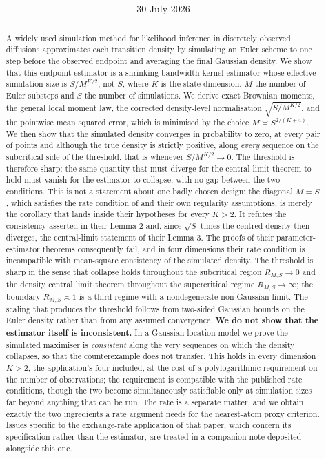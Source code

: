 \documentclass[11pt]{article}
\title{\textbf{\papertitle}}
\author{\authorname\\[0.2em]\small\affiliation\\[0.1em]\small\email\quad\textperiodcentered\quad\orcid\draftlabel}
\date{30 July 2026}
\theoremstyle{definition}
\begin{document}
\maketitle

\begin{abstract}
A widely used simulation method for likelihood inference in discretely observed diffusions approximates each transition density by simulating an Euler scheme to one step before the observed endpoint and averaging the final Gaussian density. We show that this endpoint estimator is a shrinking-bandwidth kernel estimator whose effective simulation size is $S/M^{K/2}$, not $S$, where $K$ is the state dimension, $M$ the number of Euler substeps and $S$ the number of simulations. We derive exact Brownian moments, the general local moment law, the corrected density-level normalisation $\sqrt{S/M^{K/2}}$, and the pointwise mean squared error, which is minimised by the choice $M\asymp S^{2/(K+4)}$. We then show that the simulated density converges in probability to zero, at every pair of points and although the true density is strictly positive, along \emph{every} sequence on the subcritical side of the threshold, that is whenever $S/M^{K/2}\to0$. The threshold is therefore sharp: the same quantity that must diverge for the central limit theorem to hold must vanish for the estimator to collapse, with no gap between the two conditions. This is not a statement about one badly chosen design: the diagonal $M=S$, which satisfies the rate condition of \citet{BrandtSantaClara2002} and their own regularity assumptions, is merely the corollary that lands inside their hypotheses for every $K>2$. It refutes the consistency asserted in their Lemma 2 and, since $\sqrt S$ times the centred density then diverges, the central-limit statement of their Lemma 3. The proofs of their parameter-estimator theorems consequently fail, and in four dimensions their rate condition is incompatible with mean-square consistency of the simulated density. The threshold is sharp in the sense that collapse holds throughout the subcritical region $R_{M,S}\to0$ and the density central limit theorem throughout the supercritical regime $R_{M,S}\to\infty$; the boundary $R_{M,S}\asymp1$ is a third regime with a nondegenerate non-Gaussian limit. The scaling that produces the threshold follows from two-sided Gaussian bounds on the Euler density rather than from any assumed convergence. \textbf{We do not show that the estimator itself is inconsistent.} In a Gaussian location model we prove the simulated maximiser is \emph{consistent} along the very sequences on which the density collapses, so that the counterexample does not transfer. This holds in every dimension $K>2$, the application's four included, at the cost of a polylogarithmic requirement on the number of observations; the requirement is compatible with the published rate conditions, though the two become simultaneously satisfiable only at simulation sizes far beyond anything that can be run. The rate is a separate matter, and we obtain exactly the two ingredients a rate argument needs for the nearest-atom proxy criterion. Issues specific to the exchange-rate application of that paper, which concern its specification rather than the estimator, are treated in a companion note deposited alongside this one.

\end{abstract}
\end{document}
